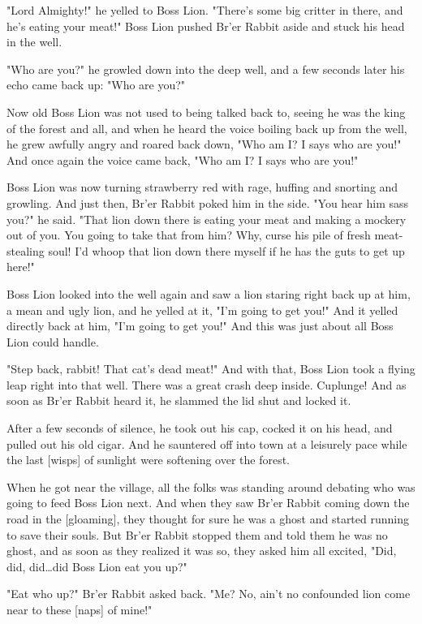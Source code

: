 "Lord Almighty!" he yelled to Boss Lion. "There's some big critter in there, and he's eating your meat!" Boss Lion pushed Br'er Rabbit aside and stuck his head in the well.

"Who are you?" he growled down into the deep well, and a few seconds later his echo came back up: "Who are you?"

Now old Boss Lion was not used to being talked back to, seeing he was the king of the forest and all, and when he heard the voice boiling back up from the well, he grew awfully angry and roared back down, "Who am I? I says who are you!" And once again the voice came back, "Who am I? I says who are you!"

Boss Lion was now turning strawberry red with rage, huffing and snorting and growling. And just then, Br'er Rabbit poked him in the side. "You hear him sass you?" he said. "That lion down there is eating your meat and making a mockery out of you. You going to take that from him? Why, curse his pile of fresh meat-stealing soul! I'd whoop that lion down there myself if he has the guts to get up here!"

Boss Lion looked into the well again and saw a lion staring right back up at him, a mean and ugly lion, and he yelled at it, "I'm going to get you!" And it yelled directly back at him, "I'm going to get you!" And this was just about all Boss Lion could handle.

"Step back, rabbit! That cat's dead meat!" And with that, Boss Lion took a flying leap right into that well. There was a great crash deep inside. Cuplunge! And as soon as Br'er Rabbit heard it, he slammed the lid shut and locked it.

After a few seconds of silence, he took out his cap, cocked it on his head, and pulled out his old cigar. And he sauntered off into town at a leisurely pace while the last [wisps] of sunlight were softening over the forest.

When he got near the village, all the folks was standing around debating who was going to feed Boss Lion next. And when they saw Br'er Rabbit coming down the road in the [gloaming], they thought for sure he was a ghost and started running to save their souls. But Br'er Rabbit stopped them and told them he was no ghost, and as soon as they realized it was so, they asked him all excited, "Did, did, did\dots did Boss Lion eat you up?"

"Eat who up?" Br'er Rabbit asked back. "Me? No, ain't no confounded lion come near to these [naps] of mine!"

